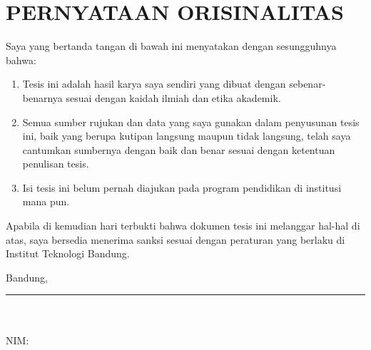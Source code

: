\chapter*{PERNYATAAN ORISINALITAS}

Saya yang bertanda tangan di bawah ini menyatakan dengan sesungguhnya bahwa:
\begin{enumerate}
  \item Tesis ini adalah hasil karya saya sendiri yang dibuat dengan sebenar-benarnya sesuai dengan kaidah ilmiah dan etika akademik.
  \item Semua sumber rujukan dan data yang saya gunakan dalam penyusunan tesis ini, baik yang berupa kutipan langsung maupun tidak langsung, telah saya cantumkan sumbernya dengan baik dan benar sesuai dengan ketentuan penulisan tesis.
  \item Isi tesis ini belum pernah diajukan pada program pendidikan di institusi mana pun.
\end{enumerate}

Apabila di kemudian hari terbukti bahwa dokumen tesis ini melanggar hal-hal di atas, saya bersedia menerima sanksi sesuai dengan peraturan yang berlaku di Institut Teknologi Bandung.

\vspace{3\baselineskip}
Bandung, \ThesisMonthYear

\vspace{4\baselineskip}
\rule{6cm}{0.4pt}\\
\ThesisAuthor\\
NIM: \ThesisNIM
